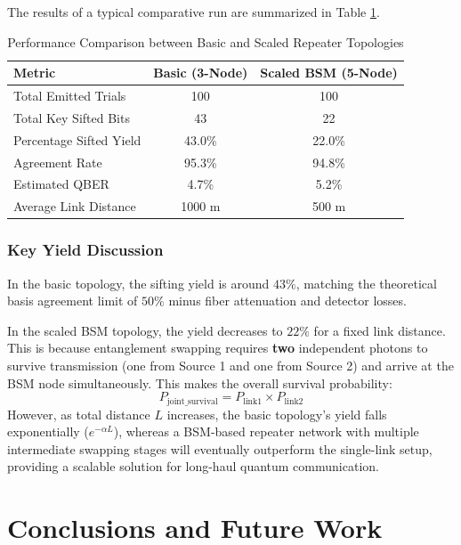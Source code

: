 \documentclass[12pt,oneside,letterpaper,english]{article}
\begin{document}
The results of a typical comparative run are summarized in Table \ref{tab:results_comp}.

\begin{table}[h!]
\centering
\caption{Performance Comparison between Basic and Scaled Repeater Topologies}
\label{tab:results_comp}
\begin{tabular}{lcc}
\toprule
\textbf{Metric} & \textbf{Basic (3-Node)} & \textbf{Scaled BSM (5-Node)} \\
\midrule
Total Emitted Trials & 100 & 100 \\
Total Key Sifted Bits & 43 & 22 \\
Percentage Sifted Yield & 43.0\% & 22.0\% \\
Agreement Rate & 95.3\% & 94.8\% \\
Estimated QBER & 4.7\% & 5.2\% \\
Average Link Distance & 1000 m & 500 m \\
\bottomrule
\end{tabular}
\end{table}

\subsubsection{Key Yield Discussion}
In the basic topology, the sifting yield is around $43\%$, matching the theoretical basis agreement limit of $50\%$ minus fiber attenuation and detector losses. 

In the scaled BSM topology, the yield decreases to $22\%$ for a fixed link distance. This is because entanglement swapping requires \textbf{two} independent photons to survive transmission (one from Source 1 and one from Source 2) and arrive at the BSM node simultaneously. This makes the overall survival probability:
\begin{equation}
    P_{\text{joint\_survival}} = P_{\text{link1}} \times P_{\text{link2}}
\end{equation}
However, as total distance $L$ increases, the basic topology's yield falls exponentially ($e^{-\alpha L}$), whereas a BSM-based repeater network with multiple intermediate swapping stages will eventually outperform the single-link setup, providing a scalable solution for long-haul quantum communication.

\section{Conclusions and Future Work}
\end{document}
